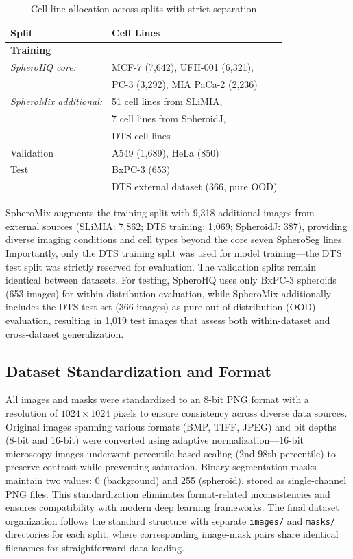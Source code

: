 \documentclass[preprint,12pt]{elsarticle}
\newcommand{\app}{SpheroSeg}
\newcommand{\dsHQ}{SpheroHQ}
\newcommand{\dsMix}{SpheroMix}
\newcommand{\dsDTS}{DTS}
\begin{document}
\begin{table}[!b]
\centering
\caption{Cell line allocation across splits with strict separation}
\label{tab:cell_line_splits}
\begin{tabular}{ll}
\hline
\textbf{Split} & \textbf{Cell Lines} \\
\hline
\multicolumn{2}{l}{\textbf{Training}} \\
\textit{\dsHQ{} core:} & MCF-7 (7,642), UFH-001 (6,321), \\
         & PC-3 (3,292), MIA PaCa-2 (2,236) \\
\textit{\dsMix{} additional:} & 51 cell lines from SLiMIA, \\
         & 7 cell lines from SpheroidJ, \\
         & DTS cell lines \\
\hline
Validation & A549 (1,689), HeLa (850) \\
\hline
Test & BxPC-3 (653) \\
     & \dsDTS{} external dataset (366, pure OOD) \\
\hline
\end{tabular}
\end{table}

\dsMix{} augments the training split with 9,318 additional images from external sources (SLiMIA: 7,862; \dsDTS{} training: 1,069; SpheroidJ: 387), providing diverse imaging conditions and cell types beyond the core seven \app{} lines. Importantly, only the \dsDTS{} training split was used for model training—the \dsDTS{} test split was strictly reserved for evaluation. The validation splits remain identical between datasets. For testing, \dsHQ{} uses only BxPC-3 spheroids (653 images) for within-distribution evaluation, while \dsMix{} additionally includes the \dsDTS{} test set (366 images) as pure out-of-distribution (OOD) evaluation, resulting in 1,019 test images that assess both within-dataset and cross-dataset generalization.

\subsection{Dataset Standardization and Format}

All images and masks were standardized to an 8-bit PNG format with a resolution of $1024 \times 1024$ pixels to ensure consistency across diverse data sources. Original images spanning various formats (BMP, TIFF, JPEG) and bit depths (8-bit and 16-bit) were converted using adaptive normalization—16-bit microscopy images underwent percentile-based scaling (2nd-98th percentile) to preserve contrast while preventing saturation. Binary segmentation masks maintain two values: 0 (background) and 255 (spheroid), stored as single-channel PNG files. This standardization eliminates format-related inconsistencies and ensures compatibility with modern deep learning frameworks. The final dataset organization follows the standard structure with separate \texttt{images/} and \texttt{masks/} directories for each split, where corresponding image-mask pairs share identical filenames for straightforward data loading.
\end{document}
